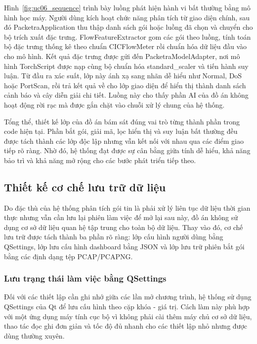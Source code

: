\documentclass[../DoAn.tex]{subfiles}
\begin{document}
Hình~\ref{fig:uc06_sequence} trình bày luồng phát hiện hành vi bất thường bằng mô hình học máy. Người dùng kích hoạt chức năng phân tích từ giao diện chính, sau đó PacketraApplication thu thập danh sách gói hoặc luồng đã chọn và chuyển cho bộ trích xuất đặc trưng. FlowFeatureExtractor gom các gói theo luồng, tính toán bộ đặc trưng thống kê theo chuẩn CICFlowMeter rồi chuẩn hóa dữ liệu đầu vào cho mô hình. Kết quả đặc trưng được gửi đến PacketraModelAdapter, nơi mô hình TorchScript được nạp cùng bộ chuẩn hóa standard\_scaler và tiến hành suy luận. Từ đầu ra xác suất, lớp này ánh xạ sang nhãn dễ hiểu như Normal, DoS hoặc PortScan, rồi trả kết quả về cho lớp giao diện để hiển thị thành danh sách cảnh báo và cây diễn giải chi tiết. Luồng này cho thấy phần AI của đồ án không hoạt động rời rạc mà được gắn chặt vào chuỗi xử lý chung của hệ thống.

Tổng thể, thiết kế lớp của đồ án bám sát đúng vai trò từng thành phần trong code hiện tại. Phần bắt gói, giải mã, lọc hiển thị và suy luận bất thường đều được tách thành các lớp độc lập nhưng vẫn kết nối với nhau qua các điểm giao tiếp rõ ràng. Nhờ đó, hệ thống đạt được sự cân bằng giữa tính dễ hiểu, khả năng bảo trì và khả năng mở rộng cho các bước phát triển tiếp theo.
\subsection{Thiết kế cơ chế lưu trữ dữ liệu}
Do đặc thù của hệ thống phân tích gói tin là phải xử lý liên tục dữ liệu thời gian thực nhưng vẫn cần lưu lại phiên làm việc để mở lại sau này, đồ án không sử dụng cơ sở dữ liệu quan hệ tập trung cho toàn bộ dữ liệu. Thay vào đó, cơ chế lưu trữ được tách thành ba phần rõ ràng: lớp cấu hình người dùng bằng QSettings, lớp lưu cấu hình dashboard bằng JSON và lớp lưu trữ phiên bắt gói bằng các định dạng tệp PCAP/PCAPNG. 

\subsubsection{Lưu trạng thái làm việc bằng QSettings}
Đối với các thiết lập cần ghi nhớ giữa các lần mở chương trình, hệ thống sử dụng QSettings của Qt để lưu cấu hình theo cặp khóa - giá trị. Cách làm này phù hợp với một ứng dụng máy tính cục bộ vì không phải cài thêm máy chủ cơ sở dữ liệu, thao tác đọc ghi đơn giản và tốc độ đủ nhanh cho các thiết lập nhỏ nhưng được dùng thường xuyên.
\end{document}
